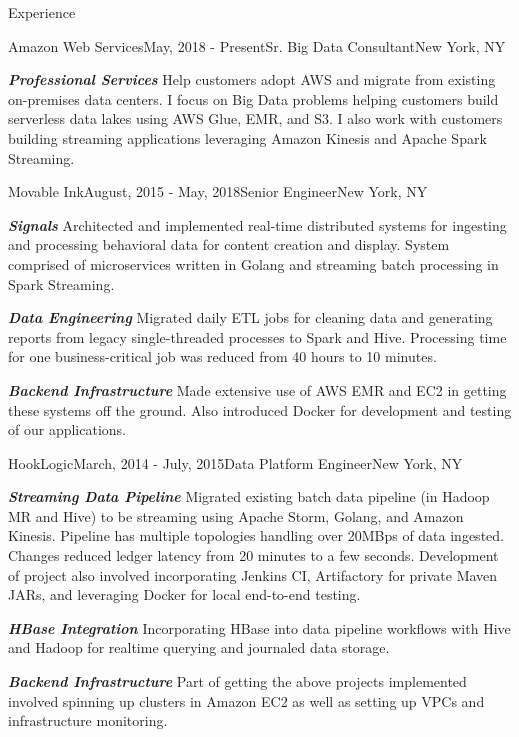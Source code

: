 \documentclass{resume} %
\begin{document}
\begin{rSection}{Experience}

  \begin{rSubsection}{Amazon Web Services}{May, 2018 - Present}{Sr. Big Data Consultant}{New York, NY}
  \item \textbf{\textit{Professional Services}} Help customers adopt
    AWS and migrate from existing on-premises data centers.  I focus on Big
    Data problems helping customers build serverless data lakes using AWS Glue,
    EMR, and S3.  I also work with customers building streaming applications
    leveraging Amazon Kinesis and Apache Spark Streaming.

  \end{rSubsection}

  \begin{rSubsection}{Movable Ink}{August, 2015 - May, 2018}{Senior Engineer}{New York, NY}
  \item \textbf{\textit{Signals}} Architected and implemented real-time distributed systems for ingesting and processing behavioral data for content creation and display. System comprised of microservices written in Golang and streaming batch processing in Spark Streaming.
  \item \textbf{\textit{Data Engineering}} Migrated daily ETL jobs for cleaning data and generating reports from legacy single-threaded processes to Spark and Hive. Processing time for one business-critical job was reduced from 40 hours to 10 minutes.
  \item \textbf{\textit{Backend Infrastructure}} Made extensive use of AWS EMR and EC2 in getting these systems off the ground. Also introduced Docker for development and testing of our applications. 


  \end{rSubsection}

  \begin{rSubsection}{HookLogic}{March, 2014 - July, 2015}{Data Platform Engineer}{New York, NY}
  \item \textbf{\textit{Streaming Data Pipeline}} Migrated existing batch data pipeline (in Hadoop MR and Hive) to be streaming using Apache Storm, Golang, and Amazon Kinesis.  Pipeline has multiple topologies handling over 20MBps of data ingested.  Changes reduced ledger latency from 20 minutes to a few seconds.  Development of project also involved incorporating Jenkins CI, Artifactory for private Maven JARs, and leveraging Docker for local end-to-end testing.
  \item \textbf{\textit{HBase Integration}} Incorporating HBase into data pipeline workflows with Hive and Hadoop for realtime querying and journaled data storage.
  \item \textbf{\textit{Backend Infrastructure}} Part of getting the above projects implemented involved spinning up clusters in Amazon EC2 as well as setting up VPCs and infrastructure monitoring.  


\end{rSubsection}
\end{rSection}
\end{document}
